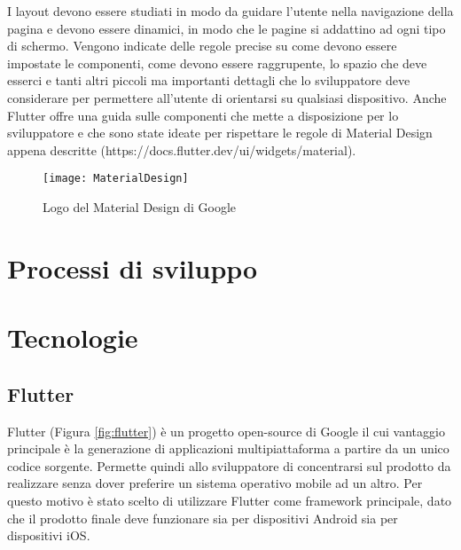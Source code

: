 I layout devono essere studiati in modo da guidare l'utente nella navigazione della pagina e devono essere dinamici, in modo che le pagine si addattino ad ogni tipo di schermo.\newline
Vengono indicate delle regole precise su come devono essere impostate le componenti, come devono essere raggrupente, lo spazio che deve esserci e tanti altri piccoli ma importanti dettagli che lo sviluppatore deve considerare per permettere all'utente di orientarsi su qualsiasi dispositivo.\newline
Anche Flutter offre una guida sulle componenti che mette a disposizione per lo sviluppatore e che sono state ideate per rispettare le regole di Material Design appena descritte (https://docs.flutter.dev/ui/widgets/material).\newline
\begin{figure}[!h] 
    \centering 
    \texttt{[image: MaterialDesign]} 
    \caption{Logo del Material Design di Google}\label{fig:material}
\end{figure}

\section{Processi di sviluppo}

\section{Tecnologie}

\subsection{Flutter}
Flutter (Figura \ref{fig:flutter}) è un progetto open-source di Google il cui vantaggio principale è la generazione di applicazioni multipiattaforma a partire da un unico codice sorgente.\newline
Permette quindi allo sviluppatore di concentrarsi sul prodotto da realizzare senza dover preferire un sistema operativo mobile ad un altro.\newline
Per questo motivo è stato scelto di utilizzare Flutter come framework principale, dato che il prodotto finale deve funzionare sia per dispositivi Android sia per dispositivi iOS.\newline

